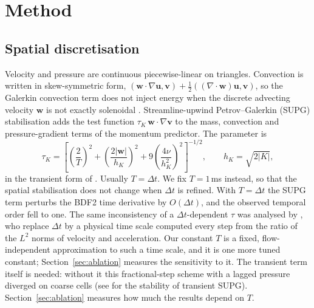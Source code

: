 \documentclass[preprint,12pt,number]{elsarticle}
\newcommand{\bu}{\mathbf{u}}
\newcommand{\bv}{\mathbf{v}}
\newcommand{\bw}{\mathbf{w}}
\newcommand{\dt}{\Delta t}
\begin{document}
\section{Method}
\label{sec:method}

\subsection{Spatial discretisation}

Velocity and pressure are continuous piecewise-linear on triangles. Convection is written in
skew-symmetric form, $(\bw\cdot\nabla\bu, \bv) + \tfrac12((\nabla\cdot\bw)\bu, \bv)$, so the
Galerkin convection term does not inject energy when the discrete advecting velocity $\bw$ is
not exactly solenoidal \citep{skew}. Streamline-upwind Petrov--Galerkin (SUPG)
stabilisation \citep{brooks1982} adds the test function $\tau_K\,\bw\cdot\nabla\bv$ to the
mass, convection and pressure-gradient terms of the momentum predictor. The parameter is
\begin{equation}
\tau_K = \left[\left(\frac{2}{T}\right)^2 + \left(\frac{2|\bw|}{h_K}\right)^2
+ 9\left(\frac{4\nu}{h_K^2}\right)^2\right]^{-1/2},\qquad h_K = \sqrt{2|K|},
\label{eq:tau}
\end{equation}
in the transient form of \citet{tezduyar2000}. Usually $T = \dt$. We fix $T = 1\,$ms
instead, so that the spatial stabilisation does not change when $\dt$ is refined. With
$T = \dt$ the SUPG term perturbs the BDF2 time derivative by $O(\dt)$, and the observed
temporal order fell to one. The same inconsistency of a $\dt$-dependent $\tau$ was analysed by
\citet{jia2023}, who replace $\dt$ by a physical time scale computed every step from the ratio
of the $L^2$ norms of velocity and acceleration. Our constant $T$ is a fixed, flow-independent
approximation to such a time scale, and it is one more tuned constant;
Section~\ref{sec:ablation} measures the sensitivity to it. The transient term itself is needed: without it this
fractional-step scheme with a lagged pressure diverged on coarse cells (see \citet{bochev2004}
for the stability of transient SUPG). Section~\ref{sec:ablation} measures how much the results
depend on $T$.
\end{document}
